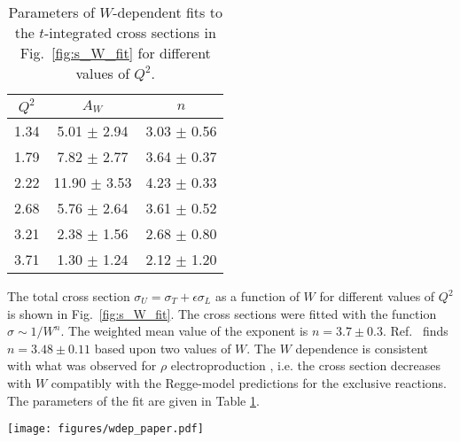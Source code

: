 \documentclass[prc,floatfix,twocolumn,superscriptaddress,letter]{revtex4}
\begin{document}
\begingroup
\squeezetable
\begin{table}
\caption{Parameters of $W$-dependent fits  to the $t$-integrated cross sections in Fig.~\ref{fig:s_W_fit} for different values of $Q^2$.}
\begin{ruledtabular}
\begin{tabular}{ccc}
 $Q^2$ &  $A_{W}$  & $n$ \\\hline
    1.34 &  5.01  $\pm$   2.94 &   3.03 $\pm$   0.56\\
    1.79 &  7.82  $\pm$   2.77 &   3.64 $\pm$   0.37\\
    2.22 &  11.90 $\pm$   3.53 &   4.23 $\pm$   0.33\\
    2.68 &  5.76  $\pm$   2.64 &   3.61 $\pm$   0.52\\
    3.21 &  2.38  $\pm$   1.56 &   2.68 $\pm$   0.80\\
    3.71 &  1.30  $\pm$   1.24 &   2.12 $\pm$   1.20\\
\end{tabular}
\end{ruledtabular}
\label{table-wdep}
\end{table}
\endgroup


The total cross section  $\sigma_U=\sigma_T+\epsilon\sigma_L$ as a function of $W$ for different values of $Q^2$ is shown in  Fig.~\ref{fig:s_W_fit}. The cross sections were fitted with the function $\sigma\sim1/W^n$. The weighted mean value of the exponent is $n=3.7\pm0.3$. Ref.~\cite{Hall-A-pi0} finds $n= 3.48\pm0.11$ based upon two values of $W$.  The $W$ dependence is consistent with what was observed for $\rho$  electroproduction  \cite{morrow}, i.e. the cross section decreases with $W$ compatibly with the Regge-model predictions \cite{Laget} for the exclusive reactions. The parameters of the fit are given in Table \ref{table-wdep}. 

\begin{figure*}
\begin{center}
\texttt{[image: figures/wdep\_paper.pdf]}
\end{center}
\caption{(Color online) 
The $t$-integrated  ``virtual photon"  cross section $\sigma_T+\epsilon\sigma_L$ as a function of $W$ for the reaction
$\gamma^*p\to p^\prime\pi^0$ for $Q^2$=1.34, 1.79, 2.22, 2.68, 3.21 and 3.71 GeV$^2$. The curves are fits
to a power law $\sigma_U= A_W/W^n$ where $A_W$ and $n$ are fit parameters.
}
\label{fig:s_W_fit} 
\end{figure*}
\end{document}
